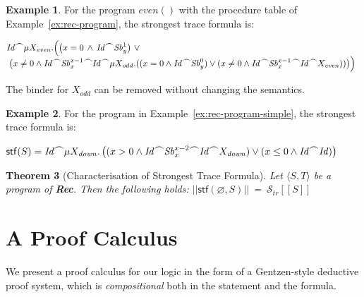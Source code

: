 \documentclass[10pt,a4paper]{amsart}
\newtheorem{theorem}{Theorem}[section]
\theoremstyle{definition}
\newtheorem{example}[theorem]{Example}
\newcommand{\denot}[1]{\left[\!\left[#1\right]\!\right]}
\newcommand{\fdenot}[1]{\left|\!\left|#1\right|\!\right|}
\newcommand{\trcdenot}[1]{\mathcal{S}_{\mathit{tr}}\!\denot{#1}}
\newcommand{\chop}[0]{\raisebox{1ex}{$\frown$}}
\newcommand{\stfs}[1]{\mathsf{stf} (#1)}
\newcommand{\stfh}[2]{\mathsf{stf}(#1, #2)}
\newcommand{\Rec}{\mbox{\bf Rec}}
\begin{document}
\begin{example}\label{ex:stf-rec}
  For the program $\mathit{even}()$ with the procedure table of
  Example~\ref{ex:rec-program}, the strongest trace formula is:

  \noindent
  $
  \begin{array}{@{}l@{}l}
    & \mathit{Id} \chop \mu X_\mathit{even}.\Bigl( 
    \bigl(x = 0 \,\land\,\mathit{Id} \chop \mathit{Sb}^{1}_{y}\bigl)\ \lor\\ 
   & \;\bigl(x \neq 0 \land
     \mathit{Id} \chop \mathit{Sb}^{x-1}_{x} \chop \mathit{Id} \chop \mu X_{\mathit{odd}}.((x = 0 \land \mathit{Id} \chop \mathit{Sb}^{0}_{y}) \lor
  (x \neq 0 \land 
     \mathit{Id} \chop \mathit{Sb}^{x-1}_{x} \chop\mathit{Id}\chop X_{\mathit{even}}))\bigr)\Bigr)
\end{array}
$

\noindent The binder for $X_{odd}$ can be removed without changing the
semantics.
\end{example}

\begin{example}\label{ex:stf-rec-simple}
  For the program in Example~\ref{ex:rec-program-simple}, the
  strongest trace formula is:\smallskip
  
  \noindent$\stfs{S} = 
      \mathit{Id} \chop 
      \mu X_\mathit{down}.\, 
          \bigl((x > 0 \land \mathit{Id} \chop 
                 \mathit{Sb}^{x-2}_x 
                 \chop \mathit{Id} \chop X_\mathit{down})
                \lor
                 (x \leq 0 \land \mathit{Id}\chop\mathit{Id})
                  \bigr)$ 
\end{example}

\begin{theorem}[Characterisation of Strongest Trace Formula]
\label{thm:stf-characterisation-rec}
Let $\langle S,T\rangle$ be a program of \Rec. Then the following holds:
%
$ \fdenot{\stfh{\varnothing}{S}} \>=\> \trcdenot{S} $
\end{theorem}

\section{A Proof Calculus}
\label{sec:proof-calculus}

We present a proof calculus for our logic in the form of a
Gentzen-style deductive proof system, which is \emph{compositional}
both in the statement and the formula.
\end{document}
